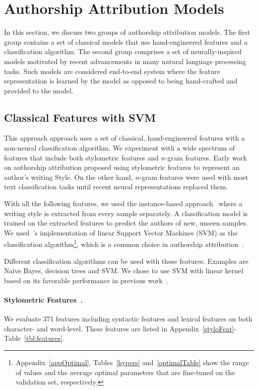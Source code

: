 \documentclass[11pt]{article}
\begin{document}
\section{Authorship Attribution Models\label{subsec:QWS}}
In this section, we discuss two groups of authorship attribution models. The first group contains a set of classical models that use hand-engineered features and a classification algorithm. The second group comprises a set of neurally-inspired models motivated by recent advancements in many natural language processing tasks. Such models are considered end-to-end system where the feature representation is learned by the model as opposed to being hand-crafted and provided to the model. 

\subsection{Classical Features with SVM} 
This approach approach uses a set of classical, hand-engineered features with a non-neural classification algorithm. We experiment with a wide spectrum of features that include both stylometric features and $n$-gram features. Early work on authorship attribution proposed using stylometric features to represent an author's writing Style. On the other hand, $n$-gram features were used with most text classification tasks until recent neural representations replaced them.

With all the following features, we used the instance-based approach~\citep{Stamatatos.e:2009} where a writing style is extracted from every sample separately. A classification model is trained on the extracted features to predict the authors of new, unseen samples. We used~\citet{scikit-learn}'s implementation of linear Support Vector Machines (SVM) as the classification algorithm\footnote{Appendix~\ref{appOptimal}, Tables~\ref{hypers} and~\ref{optimalTable} show the range of values and the average optimal parameters that are fine-tuned on the validation set, respectively.}, which is a common choice in authorship attribution~\citep{Stamatatos.E:2017}. 

Different classification algorithms can be used with these features. Examples are Na\"ive Bayes, decision trees and SVM. We chose to use SVM with linear kernel based on its favorable performance in previous work~\citep{Sapkota.U:2014,sapkota2015not,Ding.S:2015,Stamatatos.E:2017,stamatatos2018masking}. 

\paragraph{Stylometric Features~\citep{Iqbal.F:2008,Iqbal.F:2013}.}
We evaluate 371 features including syntactic features and lexical features on both character- and word-level. These features are listed in Appendix~\ref{styloFeat}-Table~\ref{tbl:features}.
\end{document}
